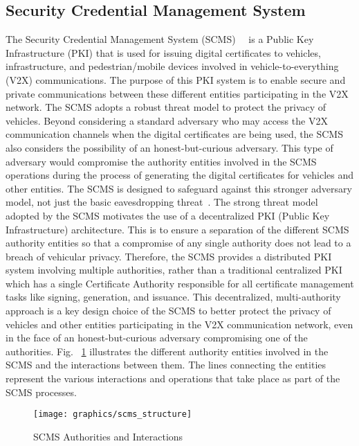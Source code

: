 \subsection{Security Credential Management System} %
\label{sec:scms}
The Security Credential Management System (SCMS)~\cite{brecht2018security}~\cite{whyte2013security} is a Public Key Infrastructure (PKI) that is used for issuing digital certificates to vehicles, infrastructure, and pedestrian/mobile devices involved in vehicle-to-everything (V2X) communications. The purpose of this PKI system is to enable secure and private communications between these different entities participating in the V2X network. The SCMS adopts a robust threat model to protect the privacy of vehicles. Beyond considering a standard adversary who may access the V2X communication channels when the digital certificates are being used, the SCMS also considers the possibility of an honest-but-curious adversary. This type of adversary would compromise the authority entities involved in the SCMS operations during the process of generating the digital certificates for vehicles and other entities. The SCMS is designed to safeguard against this stronger adversary model, not just the basic eavesdropping threat~\cite{chen2017protecting,brorsson2018guarding}. The strong threat model adopted by the SCMS motivates the use of a decentralized PKI (Public Key Infrastructure) architecture. This is to ensure a separation of the different SCMS authority entities so that a compromise of any single authority does not lead to a breach of vehicular privacy. Therefore, the SCMS provides a distributed PKI system involving multiple authorities, rather than a traditional centralized PKI which has a single Certificate Authority responsible for all certificate management tasks like signing, generation, and issuance. This decentralized, multi-authority approach is a key design choice of the SCMS to better protect the privacy of vehicles and other entities participating in the V2X communication network, even in the face of an honest-but-curious adversary compromising one of the authorities. Fig. ~\ref{fig:scmsarc} illustrates the different authority entities involved in the SCMS and the interactions between them. The lines connecting the entities represent the various interactions and operations that take place as part of the SCMS processes.

\begin{figure}[t]
\centering
\texttt{[image: graphics/scms\_structure]}
\vspace{-2mm}
\caption{SCMS Authorities and Interactions} 
\label{fig:scmsarc}
\vspace{-5mm}
\end{figure}


